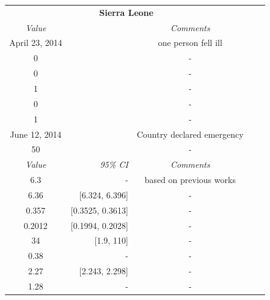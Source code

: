 \documentclass[10pt, journal,onecolumn]{IEEEtran}
\begin{document}
\begin{appendix}
\begin{table}[h]
{\begin{tabular}{@{}crccc@{}}
\multicolumn{3}{c}{\textbf{Sierra Leone}} &  \\
\cmidrule{1-3}
\textit{Value} && \textit{Comments} \\
\cmidrule{1-3}
April 23, 2014 &  & one person fell ill \cite{}\\
0& & -\\
0& & -\\
1& & -\\
0& & -\\
1& &-\\
June 12, 2014 &  & Country declared emergency\\
50 & & -\\
\cmidrule{1-3}
\textit{Value} & \textit{95\% CI} & \textit{Comments} \\
\midrule
6.3 & - & based on previous works \cite{}\\
6.36 & [6.324, 6.396] & -\\
0.357 & [0.3525, 0.3613] & -\\
0.2012 & [0.1994, 0.2028] & -\\
34 & [1.9, 110] & -\\
0.38 & - & -\\
2.27 &[2.243, 2.298] &-\\
1.28 & - &-\\
\end{tabular}
}
\end{table}



\end{appendix}
\end{document}
